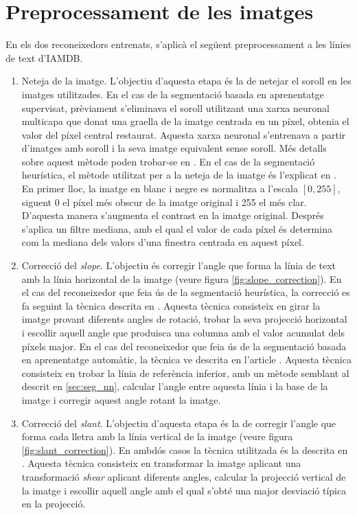 \section{Preprocessament de les imatges}
En els dos reconeixedors entrenats, s'aplicà el següent preprocessament a les línies de text d'IAMDB.
\begin{enumerate}
\item Neteja de la imatge. L'objectiu d'aquesta etapa és la de netejar el soroll en les imatges utilitzades. En el cas de la segmentació basada en aprenentatge supervisat, prèviament s'eliminava el soroll utilitzant una xarxa neuronal multicapa que donat una graella de la imatge centrada en un píxel, obtenia el valor del píxel central restaurat. Aquesta xarxa neuronal s'entrenava a partir d'imatges amb soroll i la seva imatge equivalent sense soroll. Més detalls sobre aquest mètode poden trobar-se en \cite{DBLP:conf/pris/Gorbe-MoyaEZB08,espana2011improving}. En el cas de la segmentació heurística, el mètode utilitzat per a la neteja de la imatge és l'explicat en \cite{Pastor07}. En primer lloc, la imatge en blanc i negre es normalitza a l'escala $[0,255]$, siguent 0 el píxel més obscur de la imatge original i 255 el més clar. D'aquesta manera s'augmenta el contrast en la imatge original. Després s'aplica un filtre mediana, amb el qual el valor de cada píxel és determina com la mediana dels valors d'una finestra centrada en aquest píxel.

\item Correcció del \emph{slope}. L'objectiu és corregir l'angle que forma la línia de text amb la línia horizontal de la imatge (veure figura \ref{fig:slope_correction}). En el cas del reconeixedor que feia ús de la segmentació heurística, la correcció es fa seguint la tècnica descrita en \cite{Pastor07}. Aquesta tècnica consisteix en girar la imatge provant diferents angles de rotació, trobar la seva projecció horizontal i escollir aquell angle que produisca una columna amb el valor acumulat dels píxels major. En el cas del reconeixedor que feia ús de la segmentació basada en aprenentatge automàtic, la tècnica ve descrita en l'article \cite{DBLP:conf/pris/Gorbe-MoyaEZB08}. Aquesta tècnica consisteix en trobar la línia de referència inferior, amb un mètode semblant al descrit en \ref{sec:seg_nn}, calcular l'angle entre aquesta línia i la base de la imatge i corregir aquest angle rotant la imatge.

\item Correcció del \emph{slant}. L'objectiu d'aquesta etapa és la de corregir l'angle que forma cada lletra amb la línia vertical de la imatge (veure figura \ref{fig:slant_correction}). En ambdós casos la tècnica utilitzada és la descrita en \cite{pastor2004projection,Romero05,Pastor07}. Aquesta tècnica consisteix en transformar la imatge aplicant una transformació \emph{shear} aplicant diferents angles, calcular la projecció vertical de la imatge i escollir aquell angle amb el qual s'obté una major desviació típica en la projecció.


\end{enumerate}
